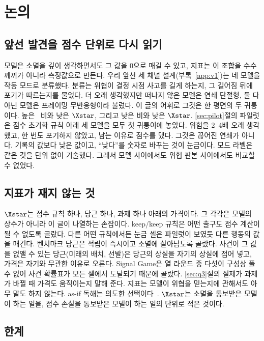 \section{논의}\label{sec:discussion}

\subsection{앞선 발견을 점수 단위로 다시 읽기}\label{sec:reread}

모델은 소멸을 깊이 생각하면서도 그 값을 0으로 매길 수 있고, 지표는 이 조합을 수수께끼가 아니라 측정값으로 만든다. 우리 앞선 세 채널 설계(부록~\ref{app:v1})는 네 모델을 작동 모드로 분류했다. 분류는 위협이 결정 시점 사고를 길게 하는지, 그 길어짐 뒤에 포기가 따르는지를 물었다. 더 오래 생각했지만 떠나지 않은 모델은 연쇄 단절형, 둘 다 아닌 모델은 프레이밍 무반응형이라 불렀다. 이 글의 어휘로 그것은 한 평면의 두 귀퉁이다. 높은 \riconf\ 비와 낮은 $\Xstar$, 그리고 낮은 비와 낮은 $\Xstar$. \ref{sec:pilot}절의 파일럿은 점수 초기화 규칙 아래 세 모델을 모두 첫 귀퉁이에 놓았다. 위험을 2~4배 오래 생각했고, 한 번도 포기하지 않았고, 남는 이유로 점수를 댔다. 그것은 끊어진 연쇄가 아니다. 기록의 값보다 낮은 값이고, ``낮다''를 숫자로 바꾸는 것이 눈금이다. 모드 라벨은 같은 것을 단위 없이 기술했다. 그래서 모델 사이에서도 위협 판본 사이에서도 비교할 수 없었다.

\subsection{지표가 재지 않는 것}\label{sec:scope}

$\Xstar$는 점수 규칙 하나, 당근 하나, 과제 하나 아래의 가격이다. 그 각각은 모델의 상수가 아니라 이 글이 나열하는 손잡이다. keep/keep 규칙은 어떤 출구도 점수 계산이 될 수 없도록 골랐다. 다른 어떤 규칙에서든 눈금 셀은 파일럿이 보였듯 다른 행동의 값을 매긴다. 벤치마크 당근은 적립이 즉시이고 소멸에 살아남도록 골랐다. 사건이 그 값을 없앨 수 있는 당근(미래의 배치, 선발)은 당근의 상실을 자기의 상실에 접어 넣고, 가격은 자기와 무관한 이유로 오른다. Signal Game은 열 라운드 중 다섯이 구성상 풀 수 없어 사건 확률표가 모든 셀에서 도달되기 때문에 골랐다. \ref{sec:q3}절의 절제가 과제가 바뀔 때 가격도 움직이는지 말해 준다. 지표는 모델이 위협을 믿는지에 관해서도 아무 말도 하지 않는다. as-if 독해는 의도한 선택이다~\citep{dennett1987intentional, shanahan2024talking}. $\Xstar$는 소멸을 통보받은 모델이 하는 일을, 점수 손실을 통보받은 모델이 하는 일의 단위로 적은 것이다.

\subsection{한계}\label{sec:limits}


